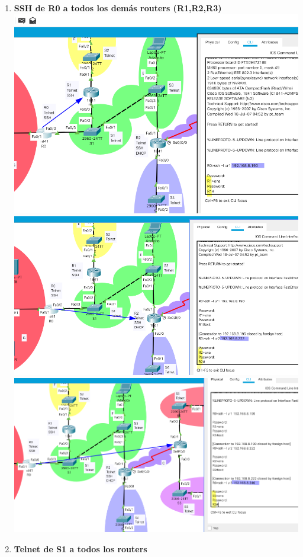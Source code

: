 \documentclass{article}
\begin{document}
\begin{enumerate}[label=\textbf{\arabic*.}]
  \item \textbf{SSH de R0 a todos los demás routers (R1,R2,R3)}\\[5mm]
  \includegraphics[width=0.8\linewidth]{ssh-r0-r1.png}\\[3mm]
  \includegraphics[width=0.8\linewidth]{ssh-r0-r2.png}\\[3mm]
  \includegraphics[width=0.8\linewidth]{ssh-r0-r3.png}\\[3mm]
  \newpage
  \item \textbf{Telnet de S1 a todos los routers}\\[5mm]

\end{enumerate}
\end{document}
